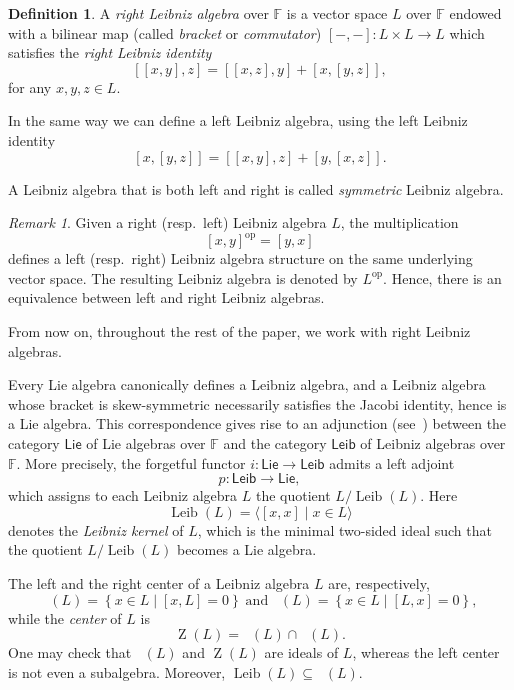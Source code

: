 \documentclass[11pt,a4paper]{amsart}
\theoremstyle{plain}
\theoremstyle{definition}
\newtheorem{definition}[subsection]{Definition}
\theoremstyle{remark}
\newtheorem{remark}[subsection]{Remark}
\numberwithin{equation}{section}
\newcommand{\0}{\emptyset}
\newcommand{\bF}{\mathbb{F}}
\DeclareMathOperator{\op}{op}
\DeclareMathOperator{\Leib}{Leib}
\DeclareMathOperator{\Zl}{Z_l}
\DeclareMathOperator{\Zr}{Z_r}
\DeclareMathOperator{\Z}{Z}
\newcommand{\Lie}{\ensuremath{\mathsf{Lie}}}
\newcommand{\sLeib}{\ensuremath{\mathsf{Leib}}}
\begin{document}
\begin{definition}\cite{loday1993}
A \emph{right Leibniz algebra} over $\bF$ is a vector space $L$ over $\bF$ endowed with a bilinear map (called \emph{bracket} or \emph{commutator}) $\left[-,-\right]\colon L\times L \to L$ which satisfies the \emph{right Leibniz identity}
\[
\left[\left[x,y\right],z\right]=\left[[x,z],y\right]+\left[x,\left[y,z\right]\right],
\]
for any $x,y,z \in L$.
\end{definition}

In the same way we can define a left Leibniz algebra, using the left Leibniz identity
\[
\left[x,\left[y,z\right]\right]=\left[\left[x,y\right],z\right]+\left[y,\left[x,z\right]\right].
\]

A Leibniz algebra that is both left and right is called \emph{symmetric} Leibniz algebra.

\begin{remark}
Given a right (resp.~left) Leibniz algebra $L$, the multiplication
\[
[x,y]^{\op}=[y,x]
\]
defines a left (resp.~right) Leibniz algebra structure on the same underlying vector space. The resulting Leibniz algebra is denoted by $L^{\op}$. Hence, there is an equivalence between left and right Leibniz algebras.

From now on, throughout the rest of the paper, we work with right Leibniz algebras.
\end{remark}
Every Lie algebra canonically defines a Leibniz algebra, and a Leibniz algebra whose bracket is skew-symmetric necessarily satisfies the Jacobi identity, hence is a Lie algebra. This correspondence gives rise to an adjunction (see~\cite{maclane2013}) between the category $\Lie$ of Lie algebras over $\bF$ and the category $\sLeib$ of Leibniz algebras over $\bF$. More precisely, the forgetful functor $i\colon \Lie \to \sLeib$ admits a left adjoint
\[
p \colon \sLeib \to \Lie,
\]
which assigns to each Leibniz algebra $L$ the quotient $L/\Leib(L)$. Here
\[
\Leib(L)=\langle [x,x] \mid x\in L \rangle
\]
denotes the \emph{Leibniz kernel} of $L$, which is the minimal two-sided ideal such that the quotient $L/\Leib(L)$ becomes a Lie algebra.

The left and the right center of a Leibniz algebra $L$ are, respectively,
\[
\Zl(L)=\left\{x\in L \mid \left[x,L\right]=0\right\} \; \text{and} \; \Zr(L)=\left\{x\in L \mid \left[L,x\right]=0\right\},
\]
while the \emph{center} of $L$ is
\[
\Z(L)=\Zl(L)\cap \Zr(L).
\]
One may check that $\Zr(L)$ and $\Z(L)$ are ideals of $L$, whereas the left center is not even a subalgebra. Moreover, $\Leib(L) \subseteq \Zr(L)$.
\end{document}
